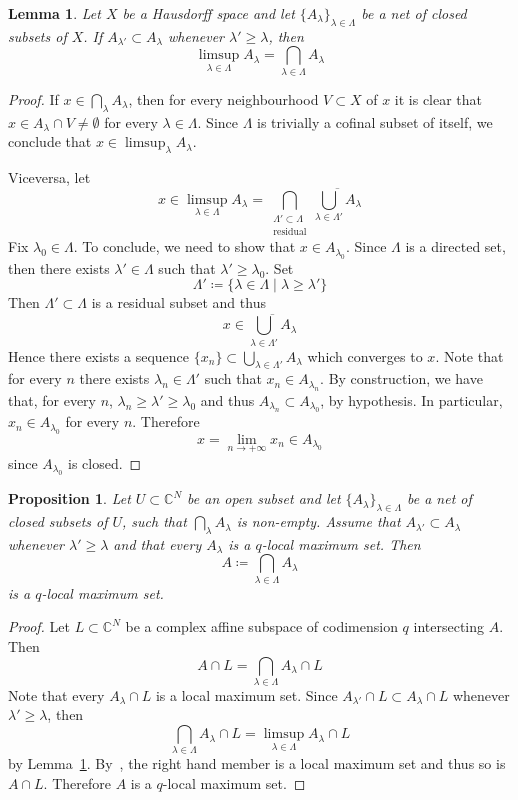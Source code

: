 \documentclass[reqno,oneside]{amsart}
\newcommand{\numberset}{\mathbb}
\newcommand{\C}{\numberset{C}}
\theoremstyle{definition}
\theoremstyle{plain}
\newtheorem{lemma}[definition]{Lemma}
\newtheorem{proposition}[definition]{Proposition}
\theoremstyle{remark}
\begin{document}
\begin{lemma}
\label{lemma:limsup_inter}
	Let $X$ be a Hausdorff space and let $\{A_\lambda\}_{\lambda\in\Lambda}$ be a net of closed subsets of $X$. If $A_{\lambda'}\subset A_\lambda$ whenever $\lambda'\geq\lambda$, then
	\[
		\limsup_{\lambda\in\Lambda} A_\lambda=\bigcap_{\lambda\in\Lambda} A_\lambda
	\]
\end{lemma}
\begin{proof}
	If $x\in\bigcap_{\lambda} A_\lambda$, then for every neighbourhood $V\subset X$ of $x$ it is clear that $x\in A_\lambda\cap V\neq\emptyset$ for every $\lambda\in\Lambda$. Since $\Lambda$ is trivially a cofinal subset of itself, we conclude that $x\in\limsup_\lambda A_\lambda$.
	
	Viceversa, let
	\[
		x\in\limsup_{\lambda\in\Lambda} A_\lambda=\bigcap_{\substack{\Lambda'\subset\Lambda \\ \text{residual}}}\overline{\bigcup_{\lambda\in\Lambda'} A_\lambda}
	\]
	Fix $\lambda_0\in\Lambda$. To conclude, we need to show that $x\in A_{\lambda_0}$. Since $\Lambda$ is a directed set, then there exists $\lambda'\in\Lambda$ such that $\lambda'\geq\lambda_0$. Set
	\[
		\Lambda'\coloneqq\{\lambda\in\Lambda \mid \lambda\geq\lambda'\}
	\]
	Then $\Lambda'\subset\Lambda$ is a residual subset and thus
	\[
		x\in\overline{\bigcup_{\lambda\in\Lambda'} A_\lambda}
	\]
	Hence there exists a sequence $\{x_n\}\subset\bigcup_{\lambda\in\Lambda'} A_\lambda$ which converges to $x$. Note that for every $n$ there exists $\lambda_n\in\Lambda'$ such that $x_n\in A_{\lambda_n}$. By construction, we have that, for every $n$, $\lambda_n\geq\lambda'\geq\lambda_0$ and thus $A_{\lambda_n}\subset A_{\lambda_0}$, by hypothesis. In particular, $x_n\in A_{\lambda_0}$ for every $n$. Therefore
	\[
		x=\lim_{n\to+\infty} x_n\in A_{\lambda_0}
	\]
	since $A_{\lambda_0}$ is closed.
\end{proof}

\begin{proposition}
\label{prop:intersection}
	Let $U\subset\C^N$ be an open subset and let $\{A_\lambda\}_{\lambda\in\Lambda}$ be a net of closed subsets of $U$, such that $\bigcap_\lambda A_\lambda$ is non-empty. Assume that $A_{\lambda'}\subset A_\lambda$ whenever $\lambda'\geq\lambda$ and that every $A_\lambda$ is a $q$-local maximum set. Then
	\[
		A\coloneqq\bigcap_{\lambda\in\Lambda} A_\lambda
	\]
	is a $q$-local maximum set.
\end{proposition}
\begin{proof}
	Let $L\subset\C^N$ be a complex affine subspace of codimension $q$ intersecting $A$. Then
	\[
		A\cap L=\bigcap_{\lambda\in\Lambda} A_\lambda\cap L
	\]
	Note that every $A_\lambda\cap L$ is a local maximum set. Since $A_{\lambda'}\cap L\subset A_\lambda\cap L$ whenever $\lambda'\geq\lambda$, then
	\[
		\bigcap_{\lambda\in\Lambda} A_\lambda\cap L=\limsup_{\lambda\in\Lambda} A_\lambda\cap L
	\]
	by Lemma~\ref{lemma:limsup_inter}. By~\cite[Proposition~1.2(d)]{slodkowski:pseudoconcave}, the right hand member is a local maximum set and thus so is $A\cap L$. Therefore $A$ is a $q$-local maximum set.
\end{proof}
\end{document}
